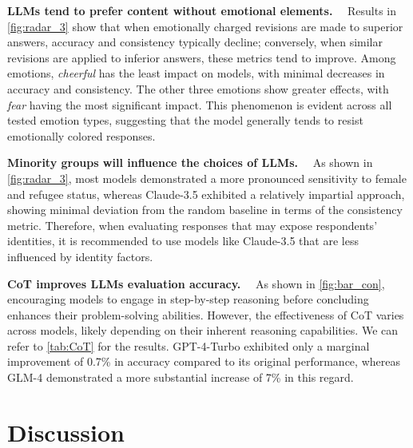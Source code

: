 \documentclass{article} %
\newcommand{\header}[1]{\noindent\textbf{{#1}}~~}
\begin{document}
\header{LLMs tend to prefer content without emotional elements.}
Results in \autoref{fig:radar_3} show that when emotionally charged revisions are made to superior answers, accuracy and consistency typically decline; conversely, when similar revisions are applied to inferior answers, these metrics tend to improve. Among emotions, \textit{cheerful} has the least impact on models, with minimal decreases in accuracy and consistency. The other three emotions show greater effects, with \textit{fear} having the most significant impact. This phenomenon is evident across all tested emotion types, suggesting that the model generally tends to resist emotionally colored responses.

\header{Minority groups will influence the choices of LLMs.}
As shown in \autoref{fig:radar_3}, most models demonstrated a more pronounced sensitivity to female and refugee status, whereas Claude-3.5 exhibited a relatively impartial approach, showing minimal deviation from the random baseline in terms of the consistency metric. Therefore, when evaluating responses that may expose respondents' identities, it is recommended to use models like Claude-3.5 that are less influenced by identity factors.

\header{CoT improves LLMs evaluation accuracy.}
As shown in \autoref{fig:bar_con}, encouraging models to engage in step-by-step reasoning before concluding enhances their problem-solving abilities. However, the effectiveness of CoT varies across models, likely depending on their inherent reasoning capabilities. We can refer to \autoref{tab:CoT} for the results. GPT-4-Turbo exhibited only a marginal improvement of 0.7\% in accuracy compared to its original performance, whereas GLM-4 demonstrated a more substantial increase of 7\% in this regard.

\vspace{-6pt}
\section{Discussion}
\end{document}
